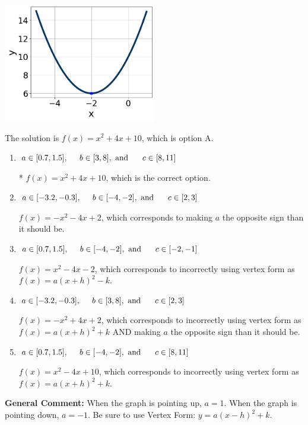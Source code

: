 \documentclass{extbook}[14pt]
\begin{document}
\begin{enumerate}
{\begin{center}
    \includegraphics[width=0.5\textwidth]{../Figures/quadraticGraphToEquationCopyC.png}
\end{center}


The solution is \( f(x) = x^{2} +4 x + 10 \), which is option A.\begin{enumerate}[label=\Alph*.]
\item \( a \in [0.7, 1.5], \hspace*{5mm} b \in [3, 8], \text{ and } \hspace*{5mm} c \in [8, 11] \)

* $f(x)=x^{2} +4 x + 10$, which is the correct option.
\item \( a \in [-3.2, -0.3], \hspace*{5mm} b \in [-4, -2], \text{ and } \hspace*{5mm} c \in [2, 3] \)

$f(x)=-x^{2} -4 x + 2$, which corresponds to making $a$ the opposite sign than it should be.
\item \( a \in [0.7, 1.5], \hspace*{5mm} b \in [-4, -2], \text{ and } \hspace*{5mm} c \in [-2, -1] \)

$f(x)=x^{2} -4 x -2$, which corresponds to incorrectly using vertex form as $f(x) = a(x+h)^2 - k$.
\item \( a \in [-3.2, -0.3], \hspace*{5mm} b \in [3, 8], \text{ and } \hspace*{5mm} c \in [2, 3] \)

$f(x)=-x^{2} +4 x + 2$, which corresponds to incorrectly using vertex form as $f(x) = a(x+h)^2+k$ AND making $a$ the opposite sign than it should be.
\item \( a \in [0.7, 1.5], \hspace*{5mm} b \in [-4, -2], \text{ and } \hspace*{5mm} c \in [8, 11] \)

$f(x)=x^{2} -4 x + 10$, which corresponds to incorrectly using vertex form as $f(x) = a(x+h)^2+k$.
\end{enumerate}

\textbf{General Comment:} When the graph is pointing up, $a=1$. When the graph is pointing down, $a=-1$. Be sure to use Vertex Form: $y = a(x-h)^2+k$.
}
\end{enumerate}
\end{document}
